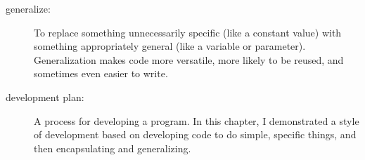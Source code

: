 \begin{description}
\item[generalize:]  To replace something unnecessarily specific
(like a constant value) with something appropriately general
(like a variable or parameter).  Generalization makes code more
versatile, more likely to be reused, and sometimes even easier
to write.

\item[development plan:]  A process for developing a program.
In this chapter, I demonstrated a style of development based on
developing code to do simple, specific things, and then encapsulating
and generalizing.


\end{description}

